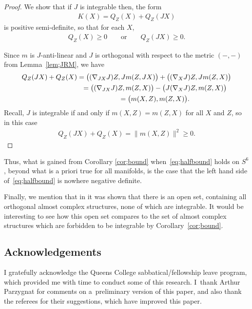 \documentclass[10pt,a4paper]{amsart}
\numberwithin{equation}{section}
\begin{document}
\begin{proof} We show that if $J$ is integrable then, the form
 \begin{gather*}
 K(X) = Q_Z(X)+ Q_Z(JX)
 \end{gather*}
 is positive semi-definite, so that for each $X$,
 \begin{gather*}
 Q_Z(X) \geq 0 \qquad \textrm{or} \qquad Q_Z(JX) \geq 0.
 \end{gather*}

Since $m$ is $J$-anti-linear and $J$ is orthogonal with respect to the metric $( - , - )$ from Lemma~\ref{lem;JRM}, we have
\begin{gather*}
Q_Z(JX) + Q_Z(X) = \big( (\nabla_{JX} J) Z, J m(Z,JX) \big) + \big( (\nabla_X J) Z, J m(Z,X) \big) \\
\hphantom{Q_Z(JX) + Q_Z(X)}{} = \big( (\nabla_{JX} J) Z, m(Z,X) \big) - \big( J (\nabla_X J) Z, m(Z,X) \big)\\
\hphantom{Q_Z(JX) + Q_Z(X)}{}= \big( m(X,Z) , m(Z,X) \big).
\end{gather*}
Recall, $J$ is integrable if and only if $m(X,Z) = m(Z,X)$ for all $X$ and $Z$, so in this case
\begin{gather*}
Q_Z(JX) + Q_Z(X) = \| m(X,Z) \|^2 \geq 0. \tag*{\qed}
\end{gather*} \renewcommand{\qed}{}
\end{proof}

Thus, what is gained from Corollary \ref{cor;bound} when~\eqref{eq;halfbound} holds on $S^6$, beyond what is a priori true for all manifolds, is the case that the left hand side of~\eqref{eq;halfbound} is nowhere negative definite.

 Finally, we mention that in \cite{BHL} it was shown that there is an open set, containing all orthogonal almost complex structures, none of which are integrable. It would be interesting to see how this open set compares to the set of almost complex structures which are forbidden to be integrable by Corollary~\ref{cor;bound}.

\subsection*{Acknowledgements}
 I gratefully acknowledge the Queens College sabbatical/fellowship leave program, which provided me with time to conduct some of this research. I~thank Arthur Parzygnat for comments on a~preliminary version of this paper, and also thank the referees for their suggestions, which have improved this paper.
\end{document}
